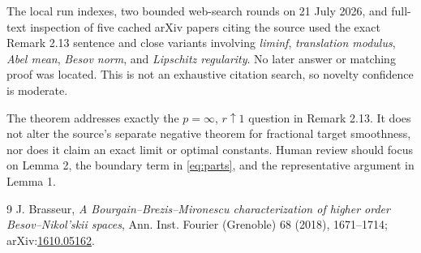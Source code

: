 \documentclass[11pt]{article}
\begin{document}
The local run indexes, two bounded web-search rounds on 21 July 2026, and
full-text inspection of five cached arXiv papers citing the source used the
exact Remark 2.13 sentence and close variants involving \emph{liminf},
\emph{translation modulus}, \emph{Abel mean}, \emph{Besov norm}, and
\emph{Lipschitz regularity}. No later answer or matching proof was located.
This is not an exhaustive citation search, so novelty confidence is moderate.

The theorem addresses exactly the $p=\infty$, $r\uparrow1$ question in
Remark 2.13. It does not alter the source's separate negative theorem for
fractional target smoothness, nor does it claim an exact limit or optimal
constants. Human review should focus on Lemma 2, the boundary term in
\eqref{eq:parts}, and the representative argument in Lemma 1.

\begin{thebibliography}{9}
J. Brasseur,
\emph{A Bourgain--Brezis--Mironescu characterization of higher order
Besov--Nikol'skii spaces},
Ann. Inst. Fourier (Grenoble) 68 (2018), 1671--1714;
arXiv:\href{https://arxiv.org/abs/1610.05162}{1610.05162}.
\end{thebibliography}
\end{document}
